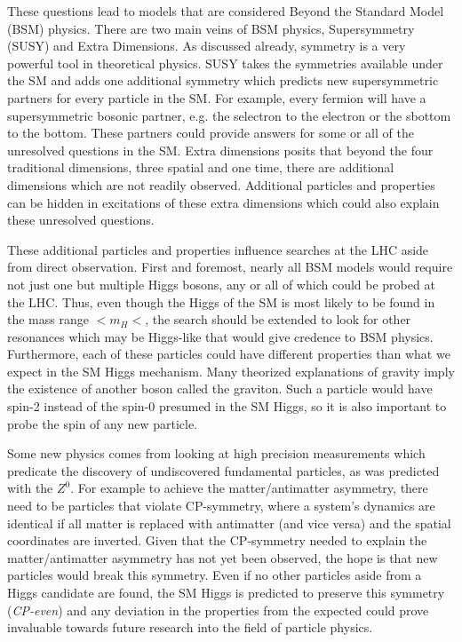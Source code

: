 These questions lead to models that are considered Beyond the Standard Model (BSM) physics. There are two main veins of BSM physics, Supersymmetry (SUSY) and Extra Dimensions. As discussed already, symmetry is a very powerful tool in theoretical physics. SUSY takes the symmetries available under the SM and adds one additional symmetry which predicts new supersymmetric partners for every particle in the SM. For example, every fermion will have a supersymmetric bosonic partner, e.g. the selectron to the electron or the sbottom to the bottom. These partners could provide answers for some or all of the unresolved questions in the SM. Extra dimensions posits that beyond the four traditional dimensions, three spatial and one time, there are additional dimensions which are not readily observed. Additional particles and properties can be hidden in excitations of these extra dimensions which could also explain these unresolved questions.

These additional particles and properties influence searches at the LHC aside from direct observation. First and foremost, nearly all BSM models would require not just one but multiple Higgs bosons, any or all of which could be probed at the LHC. Thus, even though the Higgs of the SM is most likely to be found in the mass range $<m_{H}<$, the search should be extended to look for other resonances which may be Higgs-like that would give credence to BSM physics. Furthermore, each of these particles could have different properties than what we expect in the SM Higgs mechanism. Many theorized explanations of gravity imply the existence of another boson called the graviton. Such a particle would have spin-2 instead of the spin-0 presumed in the SM Higgs, so it is also important to probe the spin of any new particle.

Some new physics comes from looking at high precision measurements which predicate the discovery of undiscovered fundamental particles, as was predicted with the $Z^{0}$. For example to achieve the matter/antimatter asymmetry, there need to be particles that violate CP-symmetry, where a system's dynamics are identical if all matter is replaced with antimatter (and vice versa) and the spatial coordinates are inverted. Given that the CP-symmetry needed to explain the matter/antimatter asymmetry has not yet been observed, the hope is that new particles would break this symmetry. Even if no other particles aside from a Higgs candidate are found, the SM Higgs is predicted to preserve this symmetry (\textit{CP-even}) and any deviation in the properties from the expected could prove invaluable towards future research into the field of particle physics.

